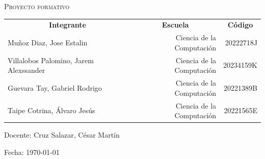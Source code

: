 \documentclass[../main]{subfiles}
\begin{document}
\begin{titlepage}
\begin{center}
		\vspace{5mm}

		{\large
			\textsc{Proyecto formativo}

		}

		\vspace{5mm}

		\begin{table}[H]
			\centering
			\begin{tabular}{lrr}
				\multicolumn{1}{c}{\textbf{ Integrante }} &
				\multicolumn{1}{c}{\textbf{ Escuela }}    &
				\multicolumn{1}{c}{\textbf{ Código }}                                             \\
				Muñoz Diaz, Jose Estalin                  & Ciencia de la Computación & 20222718J \\
				Villalobos Palomino, Jarem Alexssander    & Ciencia de la Computación & 20234159K \\
				Guevara Tay, Gabriel Rodrigo              & Ciencia de la Computación & 20221389B \\
				Taipe Cotrina, Álvaro Jesús               & Ciencia de la Computación & 20221565E
			\end{tabular}
		\end{table}

		Docente: Cruz Salazar, César Martín

		Fecha: \today
	\end{center}
	\vspace*{\fill}
\end{titlepage}
\end{document}
